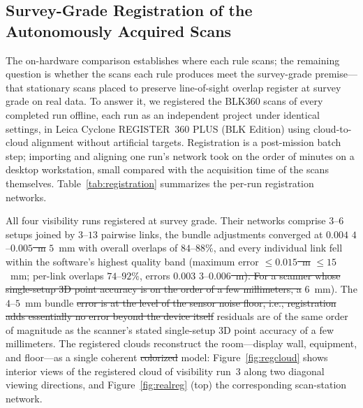 \documentclass[sensors,article,submit,pdftex,moreauthors]{Definitions/mdpi}
\providecommand{\DIFadd}[1]{{\protect\color{blue} \sf #1}} %
\providecommand{\DIFdel}[1]{{\protect\color{red}\protect\scriptsize\protect\sout{#1}}} %
\providecommand{\DIFaddbegin}{} %
\providecommand{\DIFaddend}{} %
\providecommand{\DIFdelbegin}{} %
\providecommand{\DIFdelend}{} %
\begin{document}
\subsection{Survey-Grade Registration of the Autonomously Acquired Scans}
\label{sec:realhw}

The on-hardware comparison establishes where each rule scans; the remaining
question is whether the scans each rule produces meet the survey-grade
premise---that stationary scans placed to preserve line-of-sight overlap
register at survey grade on real data. To answer it, we registered the BLK360
scans of every completed run offline, each run as an independent project under
identical settings, in Leica Cyclone REGISTER~360 PLUS (BLK Edition) using
cloud-to-cloud alignment without artificial targets.
\DIFaddbegin \DIFadd{Registration is a post-mission batch step; importing and aligning one run's
network took on the order of minutes on a desktop workstation, small compared
with the acquisition time of the scans themselves.
}\DIFaddend Table~\ref{tab:registration} summarizes the per-run registration networks.

All four visibility runs registered at survey grade. Their networks comprise
$3$--$6$ setups joined by $3$--$13$ pairwise links, the bundle adjustments
converged at \DIFdelbegin \DIFdel{$0.004$}\DIFdelend \DIFaddbegin \DIFadd{$4$}\DIFaddend --\DIFdelbegin \DIFdel{$0.005$~m }\DIFdelend \DIFaddbegin \DIFadd{$5$~mm }\DIFaddend with overall overlaps of $84$--$88\%$, and every
individual link fell within the software's highest quality band (maximum error
\DIFdelbegin \DIFdel{$\le 0.015$~m}\DIFdelend \DIFaddbegin \DIFadd{$\le15$~mm}\DIFaddend ; per-link overlaps $74$--$92\%$, errors \DIFdelbegin \DIFdel{$0.003$}\DIFdelend \DIFaddbegin \DIFadd{$3$}\DIFaddend --\DIFdelbegin \DIFdel{$0.006$~m). For a
scanner whose single-setup 3D point accuracy is on the order of a few
millimeters, a }\DIFdelend \DIFaddbegin \DIFadd{$6$~mm). The
}\DIFaddend $4$--$5$~mm bundle \DIFdelbegin \DIFdel{error is at the level of the sensor noise
floor, i.e., registration adds essentially no error beyond the device itself}\DIFdelend \DIFaddbegin \DIFadd{residuals are of the same order of magnitude as the
scanner's stated single-setup 3D point accuracy of a few millimeters}\DIFaddend .
The registered clouds reconstruct the room---display wall, equipment, and
floor---as a single coherent \DIFdelbegin \DIFdel{colorized }\DIFdelend model: Figure~\ref{fig:regcloud} shows
interior views of the registered cloud of visibility run~3 along two diagonal
viewing directions, and Figure~\ref{fig:realreg} (top) the corresponding
scan-station network.
\end{document}
